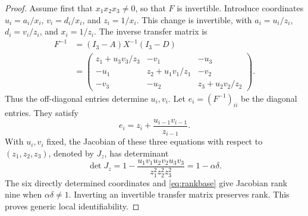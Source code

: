 \documentclass[letterpaper,10pt,conference]{ieeeconf}
\begin{document}
\begin{proof}
Assume first that \(x_1x_2x_3\ne0\), so that \(F\) is invertible.
Introduce coordinates \(u_i=a_i/x_i\), \(v_i=d_i/x_i\), and \(z_i=1/x_i\).
This change is invertible, with
\(a_i=u_i/z_i\), \(d_i=v_i/z_i\), and \(x_i=1/z_i\).
The inverse transfer matrix is
\begin{equation}\label{eq:Finverse}
\begin{split}
 F^{-1}&=(I_3-A)X^{-1}(I_3-D)\\
 &=\begin{pmatrix}
 z_1+u_3v_3/z_3&-v_1&-u_3\\
 -u_1&z_2+u_1v_1/z_1&-v_2\\
 -v_3&-u_2&z_3+u_2v_2/z_2
 \end{pmatrix}.
\end{split}
\end{equation}
Thus the off-diagonal entries determine \(u_i,v_i\).
Let \(e_i=(F^{-1})_{ii}\) be the diagonal entries. They satisfy
\begin{equation}\label{eq:diagonal}
 e_i=z_i+\frac{u_{i-1}v_{i-1}}{z_{i-1}}.
\end{equation}
With \(u_i,v_i\) fixed, the Jacobian of these three equations with
respect to \((z_1,z_2,z_3)\), denoted by \(J_z\), has determinant
\begin{equation}\label{eq:rankbase}
 \det J_z
 =1-\frac{u_1v_1u_2v_2u_3v_3}{z_1^2z_2^2z_3^2}
 =1-\alpha\delta.
\end{equation}
The six directly determined coordinates and \eqref{eq:rankbase} give
Jacobian rank nine when \(\alpha\delta\ne1\). Inverting an invertible
transfer matrix preserves rank. This proves generic local
identifiability.


\end{proof}
\end{document}
